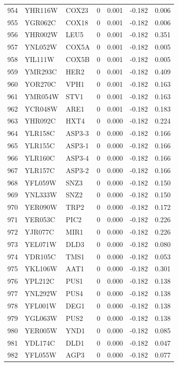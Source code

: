 \begin{longtable}{rllrrrr}
954 & YHR116W & COX23 & 0 & 0.001 & -0.182 & 0.006\\
955 & YGR062C & COX18 & 0 & 0.001 & -0.182 & 0.006\\
956 & YHR002W & LEU5 & 0 & 0.001 & -0.182 & 0.351\\
957 & YNL052W & COX5A & 0 & 0.001 & -0.182 & 0.005\\
958 & YIL111W & COX5B & 0 & 0.001 & -0.182 & 0.005\\
959 & YMR293C & HER2 & 0 & 0.001 & -0.182 & 0.409\\
960 & YOR270C & VPH1 & 0 & 0.001 & -0.182 & 0.163\\
961 & YMR054W & STV1 & 0 & 0.001 & -0.182 & 0.163\\
962 & YCR048W & ARE1 & 0 & 0.001 & -0.182 & 0.183\\
963 & YHR092C & HXT4 & 0 & 0.000 & -0.182 & 0.224\\
964 & YLR158C & ASP3-3 & 0 & 0.000 & -0.182 & 0.166\\
965 & YLR155C & ASP3-1 & 0 & 0.000 & -0.182 & 0.166\\
966 & YLR160C & ASP3-4 & 0 & 0.000 & -0.182 & 0.166\\
967 & YLR157C & ASP3-2 & 0 & 0.000 & -0.182 & 0.166\\
968 & YFL059W & SNZ3 & 0 & 0.000 & -0.182 & 0.150\\
969 & YNL333W & SNZ2 & 0 & 0.000 & -0.182 & 0.150\\
970 & YER090W & TRP2 & 0 & 0.000 & -0.182 & 0.172\\
971 & YER053C & PIC2 & 0 & 0.000 & -0.182 & 0.226\\
972 & YJR077C & MIR1 & 0 & 0.000 & -0.182 & 0.226\\
973 & YEL071W & DLD3 & 0 & 0.000 & -0.182 & 0.080\\
974 & YDR105C & TMS1 & 0 & 0.000 & -0.182 & 0.053\\
975 & YKL106W & AAT1 & 0 & 0.000 & -0.182 & 0.301\\
976 & YPL212C & PUS1 & 0 & 0.000 & -0.182 & 0.138\\
977 & YNL292W & PUS4 & 0 & 0.000 & -0.182 & 0.138\\
978 & YFL001W & DEG1 & 0 & 0.000 & -0.182 & 0.138\\
979 & YGL063W & PUS2 & 0 & 0.000 & -0.182 & 0.138\\
980 & YER005W & YND1 & 0 & 0.000 & -0.182 & 0.085\\
981 & YDL174C & DLD1 & 0 & 0.000 & -0.182 & 0.047\\
982 & YFL055W & AGP3 & 0 & 0.000 & -0.182 & 0.077\\

\end{longtable}

